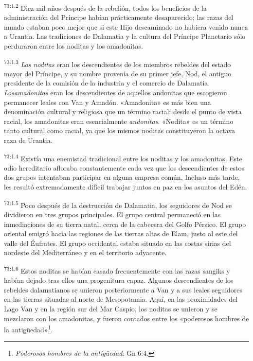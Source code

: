 \par
\textsuperscript{73:1.2} Diez mil años después de la rebelión, todos los beneficios de la administración del Príncipe habían prácticamente desaparecido; las razas del mundo estaban poco mejor que si este Hijo descaminado no hubiera venido nunca a Urantia. Las tradiciones de Dalamatia y la cultura del Príncipe Planetario sólo perduraron entre los noditas y los amadonitas.

\par
\textsuperscript{73:1.3} \textit{Los noditas} eran los descendientes de los miembros rebeldes del estado mayor del Príncipe, y su nombre provenía de su primer jefe, Nod, el antiguo presidente de la comisión de la industria y el comercio de Dalamatia. \textit{Losamadonitas} eran los descendientes de aquellos andonitas que escogieron permanecer leales con Van y Amadón. «Amadonita» es más bien una denominación cultural y religiosa que un término racial; desde el punto de vista racial, los amadonitas eran esencialmente \textit{andonitas}. «Nodita» es un término tanto cultural como racial, ya que los mismos noditas constituyeron la octava raza de Urantia.

\par
\textsuperscript{73:1.4} Existía una enemistad tradicional entre los noditas y los amadonitas. Este odio hereditario afloraba constantemente cada vez que los descendientes de estos dos grupos intentaban participar en alguna empresa común. Incluso más tarde, les resultó extremadamente difícil trabajar juntos en paz en los asuntos del Edén.

\par
\textsuperscript{73:1.5} Poco después de la destrucción de Dalamatia, los seguidores de Nod se dividieron en tres grupos principales. El grupo central permaneció en las inmediaciones de su tierra natal, cerca de la cabecera del Golfo Pérsico. El grupo oriental emigró hacia las regiones de las tierras altas de Elam, justo al este del valle del Éufrates. El grupo occidental estaba situado en las costas sirias del nordeste del Mediterráneo y en el territorio adyacente.

\par
\textsuperscript{73:1.6} Estos noditas se habían casado frecuentemente con las razas sangiks y habían dejado tras ellos una progenitura capaz. Algunos descendientes de los rebeldes dalamatianos se unieron posteriormente a Van y a sus leales seguidores en las tierras situadas al norte de Mesopotamia. Aquí, en las proximidades del Lago Van y en la región sur del Mar Caspio, los noditas se unieron y se mezclaron con los amadonitas, y fueron contados entre los «poderosos hombres de la antig\"uedad»\footnote{\textit{Poderosos hombres de la antig\"uedad}: Gn 6:4.}.

